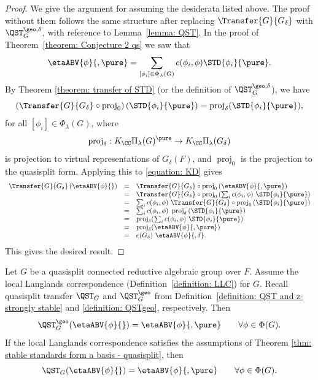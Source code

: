 \documentclass[11pt,letterpaper]{amsart}
\numberwithin{equation}{section}
\begin{document}
\begin{proof}
We give the argument for assuming the desiderata listed above. The proof without them follows the same structure after replacing $\Transfer{G}{G_\delta}$ with $\QST_{G}^{\geo,\delta}$, with reference to Lemma~\ref{lemma: QST}.
In the proof of Theorem~\ref{theorem: Conjecture 2 qs} we saw that
\begin{equation}\label{equation: KD}
        \etaABV{\phi}{,\pure}
        =
        \sum_{[\phi_i]\in \Phi_{\lambda}(G)}
        c(\phi_i,\phi) \STD{\phi_i}{\pure}.
    \end{equation}
    By Theorem \ref{theorem: transfer of STD} (or the definition of $\QST_{G}^{\geo, \delta}$), we have
\[
    \left( \Transfer{G}{G_\delta} \circ \operatorname{proj}_{0} \right) (\STD{\phi_i}{\pure}) 
    = 
\operatorname{proj}_{\delta} (\STD{\phi_i}{\pure}),
    \]
for all $[\phi_i]\in \Phi_\lambda(G)$,
where 
\[
\operatorname{proj}_\delta  :
K_\CC \Pi_\lambda(G)^{\pure}
\to
K_\CC \Pi_\lambda(G_\delta)
\]
is projection to virtual representations of $G_\delta(F)$, and $ \operatorname{proj}_0$ is the projection to the quasisplit form.
Applying this to \eqref{equation: KD} gives 
\[
\begin{array}{rcl}
\Transfer{G}{G_\delta} \left( \etaABV{\phi}{} \right) 
&=&
\Transfer{G}{G_\delta}
\circ
\operatorname{proj}_0 \left( \etaABV{\phi}{,\pure} \right) \\
&=&
\Transfer{G}{G_\delta}
\circ
\operatorname{proj}_0 \left(
\sum_{i} c(\phi_i,\phi)\ \STD{\phi_i}{\pure}
\right)\\
&=&
\sum_{i} c(\phi_i,\phi)\
\Transfer{G}{G_\delta} \circ
\operatorname{proj}_0 
\left(
\STD{\phi_i}{\pure}
\right) \\
&=&
\sum_{i} c(\phi_i,\phi)\
\operatorname{proj}_\delta
\left(
\STD{\phi_i}{\pure}
\right)\\
&=&

\operatorname{proj}_\delta(\sum_{i} c(\phi_i,\phi)\
\STD{\phi_i}{\pure})
\\
&=& 
\operatorname{proj}_\delta(\etaABV{\phi}{,\pure})
\\
&=&
e(G_\delta)\ 
\etaABV{\phi}{, \delta}.
\end{array}
\] 
This gives the desired result. 
\end{proof}

\begin{corollary}\label{corollary: QST of ABV}
Let $G$ be a quasisplit connected reductive algebraic group over $F$. 
Assume the local Langlands correspondence  (Definition~\ref{definition: LLC}) for $G$.
Recall quasisplit transfer $\QST_{G}$ and $\QST_{G}^\geo$ from Definition~\ref{definition: QST and z-strongly stable} and \ref{definition: QSTgeo}, respectively. 
Then
    \[
    \QST_{G}^\geo (\etaABV{\phi}{}) 
    = 
    \etaABV{\phi}{,\pure}
    \qquad \forall \phi\in \Phi(G).
    \]
If the local Langlands correspondence satisfies  the assumptions of Theorem \ref{thm: stable standards form a basis - quasisplit}, then
    \[
    \QST_{G} (\etaABV{\phi}{}) 
    = 
    \etaABV{\phi}{,\pure}
    \qquad \forall \phi\in \Phi(G).
    \]
\end{corollary}
\end{document}
